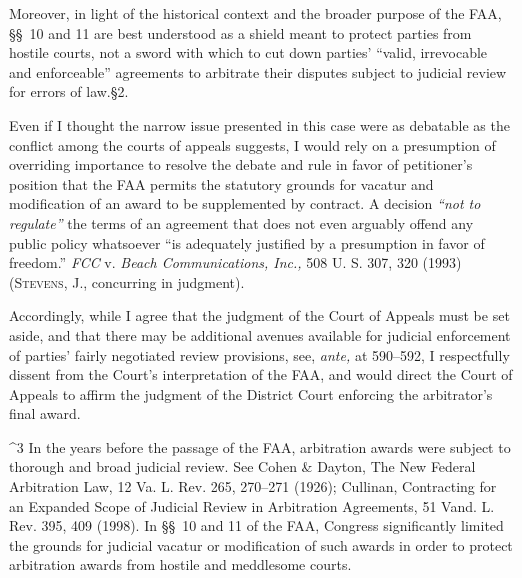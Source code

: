   Moreover, in light of the historical context and the broader purpose
of the FAA, \S\S~10 and 11 are best understood as a shield meant to
protect parties from hostile courts, not a sword with which to cut
down parties' ``valid, irrevocable and enforceable'' agreements
to arbitrate their disputes subject to judicial review for errors of
law.\footnotemark[3] \S2.

  Even if I thought the narrow issue presented in this case were as
debatable as the conflict among the courts of appeals suggests, I would
rely on a presumption of overriding importance to resolve the debate
and rule in favor of petitioner's position that the FAA permits
the statutory grounds for vacatur and modification of an award to be
supplemented by contract. A decision \emph{``not to regulate''} the terms
of an agreement that does not even arguably offend any public policy
whatsoever ``is adequately justified by a presumption in favor of
freedom.'' \emph{FCC} v. \emph{Beach Communications, Inc.,} 508 U. S. 307,
320 (1993) (\textsc{Stevens,} J., concurring in judgment).

  Accordingly, while I agree that the judgment of the Court of Appeals
must be set aside, and that there may be additional avenues available
for judicial enforcement of parties' fairly negotiated review
provisions, see, \emph{ante,} at 590--592, I respectfully dissent from
the Court's interpretation of the \newpage  FAA, and would direct the
Court of Appeals to affirm the judgment of the District Court enforcing
the arbitrator's final award.

^3 In the years before the passage of the FAA, arbitration awards were
subject to thorough and broad judicial review. See Cohen \& Dayton,
The New Federal Arbitration Law, 12 Va. L. Rev. 265, 270--271 (1926);
Cullinan, Contracting for an Expanded Scope of Judicial Review in
Arbitration Agreements, 51 Vand. L. Rev. 395, 409 (1998). In \S\S~10
and 11 of the FAA, Congress significantly limited the grounds for
judicial vacatur or modification of such awards in order to protect
arbitration awards from hostile and meddlesome courts.

